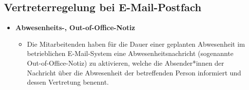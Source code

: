 \documentclass[a4paper, fontsize=11pt]{scrartcl}
\begin{document}
\subsection{Vertreterregelung bei E-Mail-Postfach}
\begin{itemize}
  \item \textbf{Abwesenheits-, Out-of-Office-Notiz} \\
  \begin{itemize}
    \item Die Mitarbeitenden haben für die Dauer einer geplanten Abwesenheit im betrieblichen E-Mail-System eine Abwesenheitsnachricht (sogenannte Out-of-Office-Notiz) zu aktivieren, welche die Absender*innen der Nachricht über die Abwesenheit der betreffenden Person informiert und dessen Vertretung benennt.
  \end{itemize}


\end{itemize}
\end{document}
